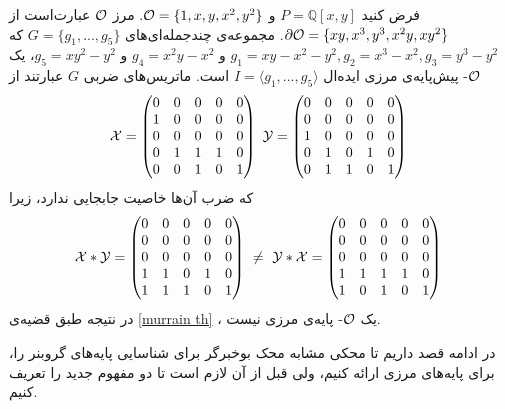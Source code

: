 \begin{example}
فرض کنید 
$P = \mathbb{Q}[x,y]$
و 
${\mathcal O} = \{1,x,y,x^{2},y^{2}\}$.
مرز 
${\mathcal O}$
عبارت‌است از 
$\partial\mathcal{O} = \{xy, x^{3}, y^{3}, x^{2}y, xy^{2}\}$.
مجموعه‌ی چندجمله‌ای‌های 
$G = \{g_{1},...,g_{5}\}$
که 
$g_{1} = xy - x^{2} - y^{2}, g_{2} = x^{3} - x^{2}, g_{3} = y^{3} - y^{2}$
و
$g_{4} = x^{2}y - x^{2}$
و
$g_{5} = xy^{2} - y^{2}$،
یک 
${\mathcal O}$-
پیش‌پایه‌ی مرزی ایده‌ال 
$I = \langle g_{1}, ..., g_{5}\rangle$
است. ماتریس‌های ضربی 
$G$
عبارتند از 
\begin{align*}
	\mX = \begin{pmatrix}
	0&0&0&0&0\\
	1&0&0&0&0\\
	0&0&0&0&0\\
	0&1&1&1&0\\
	0&0&1&0&1\\
	\end{pmatrix} \ 
	\mY = \begin{pmatrix}
	0&0&0&0&0\\
	0&0&0&0&0\\
	1&0&0&0&0\\
	0&1&0&1&0\\
	0&1&1&0&1\\
	\end{pmatrix} \ 
\end{align*}
که ضرب آن‌ها خاصیت جابجایی ندارد، زیرا
\begin{align*}
\mX*\mY = \begin{pmatrix}
0&0&0&0&0\\
0&0&0&0&0\\
0&0&0&0&0\\
1&1&0&1&0\\
1&1&1&0&1\\
\end{pmatrix} \ \neq \  
\mY*\mX = \begin{pmatrix}
0&0&0&0&0\\
0&0&0&0&0\\
0&0&0&0&0\\
1&1&1&1&0\\
1&0&1&0&1\\
\end{pmatrix} \ 
\end{align*}
در نتیجه طبق قضیه‌ی 
\ref{murrain th}
، یک 
${\mathcal O}$-
پایه‌ی مرزی نیست. 
\end{example}
 در ادامه قصد داریم تا محکی مشابه محک بوخبرگر برای شناسایی پایه‌‌های گروبنر را، برای پایه‌های مرزی ارائه کنیم، ولی قبل از آن لازم است تا دو مفهوم جدید را تعریف کنیم.
 
